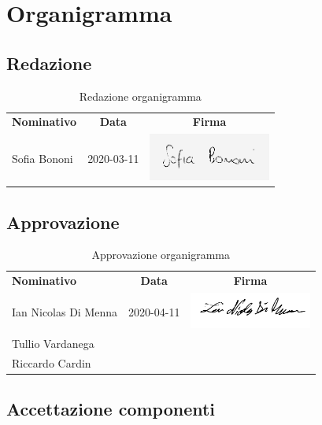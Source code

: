 \documentclass[../piano-di-progetto.tex]{subfiles}
\begin{document}
  \section{Organigramma}

  \subsection{Redazione}

  \begin{table}[H]
    \centering
    \begin{tabular}{lcc}
      \rowcolor{lightgray}

      \textbf{Nominativo}  & \textbf{Data} & \textbf{Firma}  \\
    Sofia Bononi & 2020-03-11 & \includegraphics[width=4cm]{img/sofia-g.png}     \\    
    \end{tabular}
    \caption{Redazione organigramma}
  \end{table}

  \subsection{Approvazione}

  \begin{table}[H]
    \centering
    \begin{tabular}{lcc}
      \rowcolor{lightgray}
      \textbf{Nominativo}  & \textbf{Data} & \textbf{Firma}  \\
      Ian Nicolas Di Menna & 2020-04-11 & \includegraphics[width=4cm]{img/ian.png}     \\
      Tullio Vardanega & &    \\
      Riccardo Cardin & &
    \end{tabular}
    \caption{Approvazione organigramma}
  \end{table}

  \subsection{Accettazione componenti}
\end{document}

